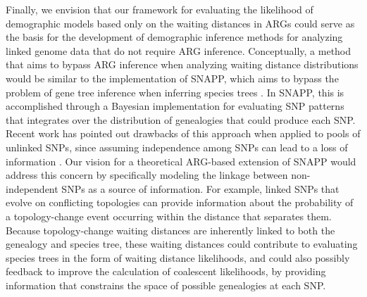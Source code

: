 \documentclass[11pt]{article}
\begin{document}
Finally, we envision that our framework for evaluating the 
likelihood of demographic models based only on the waiting distances
in ARGs could serve as the basis for the development of demographic
inference methods for analyzing linked genome data that do 
not require ARG inference.
% 
Conceptually, a method that aims to bypass ARG inference when 
analyzing waiting distance distributions would be similar to 
the implementation of SNAPP, which aims to bypass the problem of 
gene tree inference when inferring species trees 
\citep{bryant2012inferring}.
In SNAPP, this is accomplished through a Bayesian implementation
for evaluating SNP patterns that integrates over the distribution
of genealogies that could produce each SNP.
% 
Recent work has pointed out drawbacks of this approach when applied to
pools of unlinked SNPs, since assuming independence among SNPs can 
lead to a loss of information \citep{zhu2021complexity}. 
% 
Our vision for a theoretical ARG-based extension of SNAPP would 
address this concern by specifically modeling the linkage between 
non-independent SNPs as a source of information.
% 
For example, linked SNPs that evolve on conflicting topologies can 
provide information about the probability of a topology-change event 
occurring within the distance that separates them. 
% 
Because topology-change waiting distances are inherently linked to both
the genealogy and species tree, these waiting distances could contribute
to evaluating species trees in the form of waiting distance likelihoods,
and could also possibly feedback to improve the calculation of coalescent
likelihoods, by providing information that constrains the space of 
possible genealogies at each SNP. 
\end{document}
